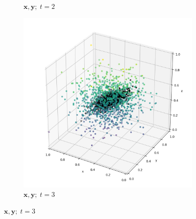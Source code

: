 \documentclass[]{article}
\newcommand{\xx}{\mathbf{x}}
\newcommand{\yy}{\mathbf{y}}
\begin{document}
\begin{figure}[H]
\begin{subfigure}{0.3\textwidth}
		\caption{$\xx, \yy; \; t=2$}
		\label{fig:2}
	\end{subfigure}\hfil
	\begin{subfigure}{0.3\textwidth}
		\includegraphics[width=\linewidth]{resources/X_Y_3_simulated.png}
		\caption{$\xx, \yy; \; t=3$}
		\label{fig:3}
	\end{subfigure}
	

\end{figure}
\end{document}
